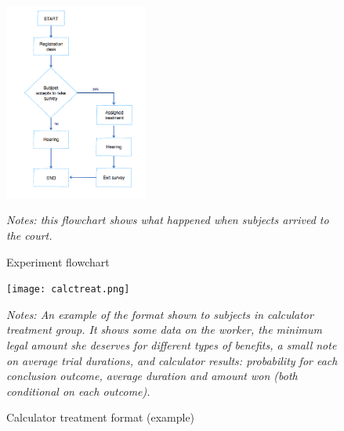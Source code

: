 \documentclass[11pt]{article}
\begin{document}
\begin{figure}[H]
   \caption{Experiment flowchart}
   \label{treatment_flowchart}
    \begin{center}
    \includegraphics[width=0.42\textwidth]{./Figuras/Experiment_flowchart.png}
    \end{center}
    \footnotesize
    \textit{Notes: this flowchart shows what happened when subjects arrived to the court.}
\end{figure}
    



\begin{figure}[H]
    \caption{Calculator treatment format (example)}
    \label{calc_template}
    \begin{center}
        \texttt{[image: calctreat.png]}
        \end{center}
        {\footnotesize \textit{Notes: An example of the format shown to subjects in calculator treatment group. It shows some data on the worker, the minimum legal amount she deserves for different types of benefits, a small note on average trial durations, and calculator results: probability for each conclusion outcome, average duration and amount won (both conditional on each outcome).}}
\end{figure}
\end{document}
